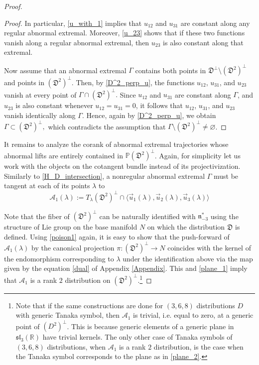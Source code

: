 \documentclass[11pt,letterpaper]{amsart}
\numberwithin{equation}{section}
\begin{document}
\begin{proof}
\begin{proof}
In particular, \eqref{u_with_1} implies that \(u_{12}\) and \(u_{31}\) are constant along any regular abnormal extremal. Moreover, \eqref{u_23} shows that if these two functions vanish along a regular abnormal extremal, then \(u_{23}\) is also constant along that extremal.

Now assume that an abnormal extremal $\Gamma$ contains both points in $\mathfrak D^\perp \setminus (\mathfrak D^2)^\perp$ and points in $(\mathfrak D^2)^\perp$. Then, by \eqref{D^2_perp_u}, the functions $u_{12}$, $u_{31}$, and $u_{23}$ vanish at every point of
$
\Gamma \cap (\mathfrak D^2)^\perp.
$
Since $u_{12}$ and $u_{31}$ are constant along $\Gamma$, and $u_{23}$ is also constant whenever $u_{12}=u_{31}=0$, it follows that $u_{12}$, $u_{31}$, and $u_{23}$ vanish identically along $\Gamma$. Hence, again by \eqref{D^2_perp_u}, we obtain
$
\Gamma \subset (\mathfrak D^2)^\perp,
$
which contradicts the assumption that
$
\Gamma \setminus (\mathfrak D^2)^\perp \neq \varnothing
$.
\end{proof}
It remains to analyze the corank of abnormal extremal trajectories whose abnormal lifts are entirely contained in  $\mathbb P(\mathfrak D^2)^\perp$.
Again, for simplicity let us work with the objects on the cotangent bundle instead of its projectivization.
Similarly to \eqref{H_D_intersection}, a nonregular abnormal extremal $\Gamma$ must be tangent at each of its points $\lambda$ to 
\begin{equation}
\label{H_D_intersection_1}
\mathcal A_1(\lambda):= 
T_\lambda (\mathfrak D^2)^\perp\cap \langle \vec u_1(\lambda), \vec u_2(\lambda), \vec u_3(\lambda)  \rangle
\end{equation}

Note that the fiber of $(\mathfrak D^2)^\perp$ can be naturally identified with $\mathfrak n_{-3}^*$ using the structure of Lie group on the base manifold $N$ on which the distribution $\mathfrak D$ is defined. Using \eqref{poison1} again, it is easy to show that the push-forward of $\mathcal A_1(\lambda)$ by the canonical projection $\pi:(\mathfrak D^2)^\perp\to N$ coincides with the kernel of the endomorphism corresponding to $\lambda$ under the identification above via the map given by the equation \eqref{dual} of Appendix \ref{Appendix}. This and \eqref{plane_1} imply that $\mathcal A_1$ is a rank $2$ distribution on $(\mathfrak D^2)^\perp$.\footnote{Note that if the same constructions are done for $(3,6,8)$ distributions $D$ with generic Tanaka symbol, then $\mathcal A_1$ is trivial, i.e. equal to zero, at a generic point of $(D^2)^\perp$. This is because generic elements of a generic plane in $\mathfrak{sl}_3(\mathbb R)$ have trivial kernels. The only other case of Tanaka symbols of $(3,6,8)$ distributions, when $\mathcal A_1$ is a rank $2$ distribution, is the case when the Tanaka symbol corresponds to the plane as in \eqref{plane_2}.}


\end{proof}
\end{document}
